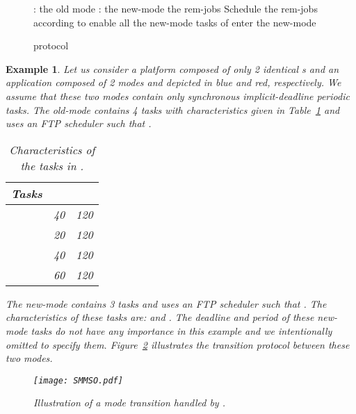 \documentclass{article}
\newtheorem{validity test}{Validity Test}
\newtheorem{Example}{Example}
\begin{document}
\begin{figure}
\begin{center}
\begin{minipage}{10cm}
\begin{algorithmic}[1]
\REQUIRE : the old mode
\REQUIRE : the new-mode
\REQUIRE the rem-jobs
\WHILE{\TRUE}
	\STATE Schedule the rem-jobs according to 
		\IF{()}
			\STATE enable all the new-mode tasks of 
			\STATE enter the new-mode 
		\ENDIF
	\ENDIF
\ENDWHILE
\end{algorithmic}
\end{minipage}
\end{center}
\caption{ protocol}
\label{algo:SMMSO}
\end{figure}

\begin{Example}\label{example_protocol_smmso}
Let us consider a platform  composed of only 2 \emph{identical} s and an application composed of 2 modes  and  depicted in blue and red, respectively. We assume that these two modes contain only synchronous implicit-deadline periodic tasks. The old-mode  contains 4 tasks with characteristics given in Table~\ref{tab:scheduler_example_smmso1} and uses an FTP scheduler  such that .

\begin{table}[h!]
\centering
\begin{tabular}{| c | c | c |}
\hline
Tasks &  &   \\
\hline
 & 40 & 120 \\
\hline
 & 20 & 120 \\
\hline
 & 40 & 120 \\
\hline
 & 60 & 120 \\
\hline
\end{tabular}
\caption{Characteristics of the tasks in .}
\label{tab:scheduler_example_smmso1}
\end{table}

\noindent The new-mode  contains 3 tasks  and uses an FTP scheduler  such that . The characteristics of these tasks are:  and . The deadline and period of these new-mode tasks do not have any importance in this example and we intentionally omitted to specify them. Figure~\ref{fig:Multimode:SMMSO_example} illustrates the  transition protocol between these two modes. 

\begin{figure}
\begin{center}
\texttt{[image: SMMSO.pdf]}
\caption{Illustration of a mode transition handled by .}
\label{fig:Multimode:SMMSO_example}
\end{center}
\end{figure}


\end{Example}
\end{document}
